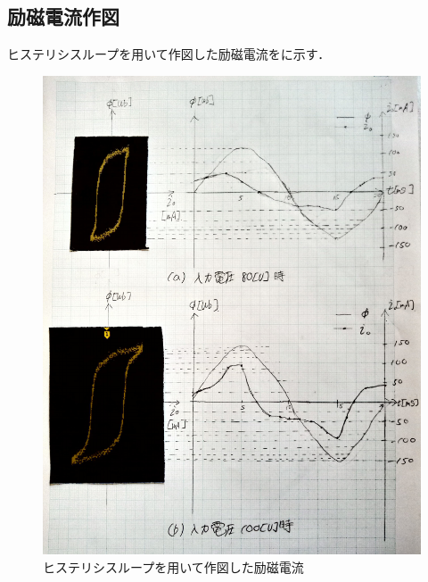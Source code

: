 \subsection{励磁電流作図}
ヒステリシスループを用いて作図した励磁電流をに示す．
\begin{figure}[h]
	\centering
	\includegraphics[scale=0.8]{./data/graph/3.pdf}
	\caption{ヒステリシスループを用いて作図した励磁電流}
	\label{fig:3}
\end{figure}